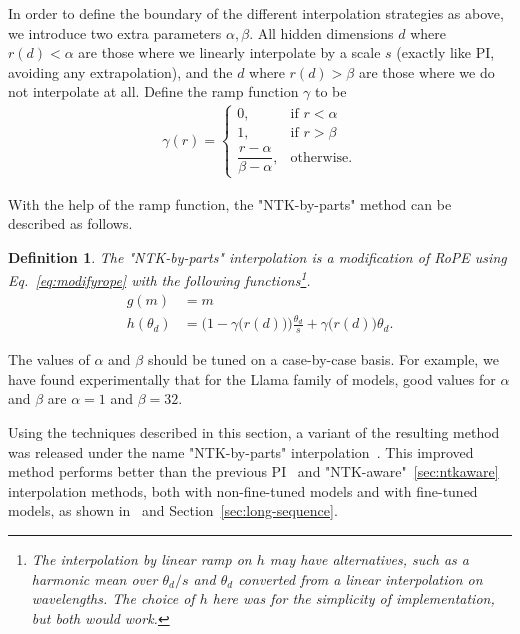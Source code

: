 \documentclass{article} %
\newtheorem{definition}{Definition}
\begin{document}
In order to define the boundary of the different interpolation strategies as above, we introduce two extra parameters $\alpha, \beta$. All hidden dimensions $d$ where $r(d) < \alpha$ are those where we linearly interpolate by a scale $s$ (exactly like PI, avoiding any extrapolation), and the $d$ where $r(d) > \beta$ are those where we do not interpolate at all. Define the ramp function $\gamma$ to be
\begin{align}
\gamma(r) = 
\begin{cases}
    0, &\text{if } r < \alpha\\
    1, &\text{if } r > \beta\\
    \dfrac{r - \alpha}{\beta - \alpha}, &\text{otherwise}.
\end{cases}
\end{align}


With the help of the ramp function, the "NTK-by-parts" method can be described as follows.

\begin{definition}
The "NTK-by-parts" interpolation is a modification of RoPE using Eq.~\ref{eq:modifyrope} with the following functions\footnote{The interpolation by linear ramp on $h$ may have alternatives, such as a harmonic mean over $\theta_d/s$ and $\theta_d$ converted from a linear interpolation on wavelengths. The choice of $h$ here was for the simplicity of implementation, but both would work.}.
    \begin{align}
    g(m) &= m\\
    h(\theta_d) &= 
    \Big(1-\gamma\big(r(d)\big)\Big) \frac{\theta_d}{s} + \gamma\big(r(d)\big) \theta_d.
\end{align}
\end{definition}


The values of $\alpha$ and $\beta$ should be tuned on a case-by-case basis. For example, 
we have found experimentally that for the Llama family of models, good values for $\alpha$ and $\beta$ are $\alpha = 1$ and $\beta = 32$.

Using the techniques described in this section, a variant of the resulting method was released under the name "NTK-by-parts" interpolation~\citep{blocntkparts}. This improved method performs better than the previous PI~\citep{chen2023extending} and "NTK-aware"~\ref{sec:ntkaware} interpolation methods, both with non-fine-tuned models and with fine-tuned models, as shown in~\citep{blocntkparts} and Section~\ref{sec:long-sequence}.%
\end{document}
